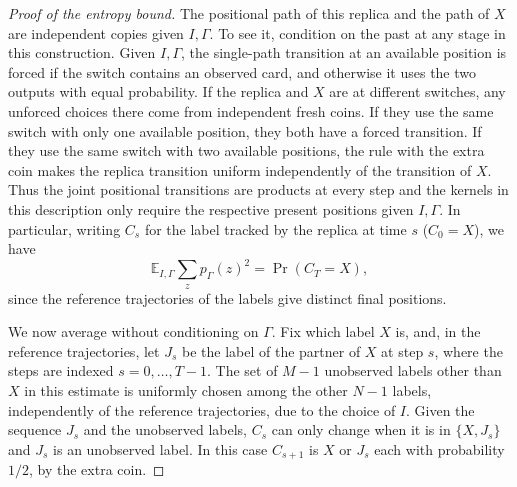 \begin{proof}[Proof of the entropy bound]
The positional path of this replica and the path of \(X\) are independent copies given
\(I,\Gamma\). To see it, condition on the past at any stage in this construction. Given
\(I,\Gamma\), the single-path transition at an available position is forced if the switch contains an
observed card, and otherwise it uses the two outputs with equal probability. If the replica and
\(X\) are at different switches, any unforced choices there come from independent fresh coins.
If they use the same switch with only one available position, they both have a forced transition. If they use
the same switch with two available positions, the rule with the extra coin makes the replica transition
uniform independently of the transition of \(X\). Thus the joint positional transitions are
products at every step and the kernels in this description only require the respective present
positions given \(I,\Gamma\). In particular, writing \(C_s\) for the label tracked by the
replica at time \(s\) (\(C_0=X\)), we have
\[
\mathbb E_{I,\Gamma}\sum_z p_\Gamma(z)^2=\Pr(C_T=X),
\]
since the reference trajectories of the labels give distinct final positions.

We now average without conditioning on \(\Gamma\). Fix which label \(X\) is, and, in the
reference trajectories, let \(J_s\) be the label of the partner of \(X\) at step \(s\), where
the steps are indexed \(s=0,\ldots,T-1\). The set of \(M-1\) unobserved labels other than \(X\) in
this estimate is uniformly chosen among the other \(N-1\) labels, independently of the
reference trajectories, due to the choice of \(I\). Given the sequence \(J_s\) and the unobserved
labels, \(C_s\) can only change when it is in \(\{X,J_s\}\) and \(J_s\) is an unobserved label. In
this case \(C_{s+1}\) is \(X\) or \(J_s\) each with probability \(1/2\), by the extra coin.


\end{proof}
